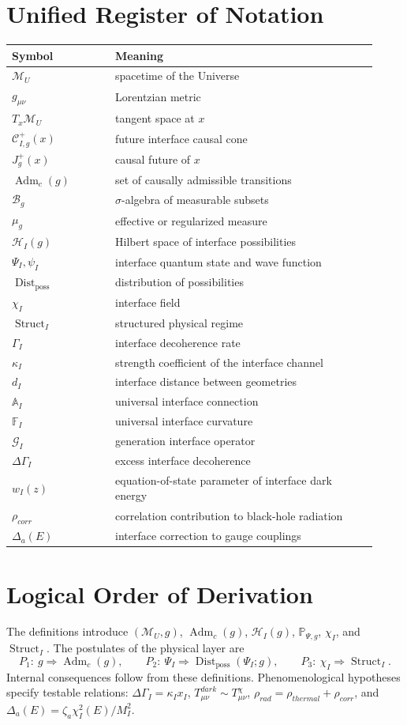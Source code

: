 \documentclass[12pt,a4paper]{article}
\DeclareMathOperator{\Adm}{Adm}
\DeclareMathOperator{\Struct}{Struct}
\DeclareMathOperator{\Dist}{Dist}
\newcommand{\M}{\mathcal M_U}
\newcommand{\Hilb}{\mathcal H}
\newcommand{\Prob}{\mathbb P}
\newcommand{\Acal}{\mathbb A_I}
\newcommand{\Fcal}{\mathbb F_I}
\begin{document}
\section{Unified Register of Notation}
\begin{longtable}{p{0.26\linewidth}p{0.66\linewidth}}
\toprule
Symbol & Meaning \\
\midrule
$\M$ & spacetime of the Universe \\
$g_{\mu\nu}$ & Lorentzian metric \\
$T_x\M$ & tangent space at $x$ \\
$\mathcal C^+_{I,g}(x)$ & future interface causal cone \\
$J_g^+(x)$ & causal future of $x$ \\
$\Adm_c(g)$ & set of causally admissible transitions \\
$\mathcal B_g$ & $\sigma$-algebra of measurable subsets \\
$\mu_g$ & effective or regularized measure \\
$\Hilb_I(g)$ & Hilbert space of interface possibilities \\
$\Psi_I,\psi_I$ & interface quantum state and wave function \\
$\Dist_{\mathrm{poss}}$ & distribution of possibilities \\
$\chi_I$ & interface field \\
$\Struct_I$ & structured physical regime \\
$\Gamma_I$ & interface decoherence rate \\
$\kappa_I$ & strength coefficient of the interface channel \\
$d_I$ & interface distance between geometries \\
$\Acal$ & universal interface connection \\
$\Fcal$ & universal interface curvature \\
$\mathcal G_I$ & generation interface operator \\
$\Delta\Gamma_I$ & excess interface decoherence \\
$w_I(z)$ & equation-of-state parameter of interface dark energy \\
$\rho_{corr}$ & correlation contribution to black-hole radiation \\
$\Delta_a(E)$ & interface correction to gauge couplings \\
\bottomrule
\end{longtable}

\section{Logical Order of Derivation}
The definitions introduce $(\M,g)$, $\Adm_c(g)$, $\Hilb_I(g)$, $\Prob_{\Psi,g}$, $\chi_I$, and $\Struct_I$. The postulates of the physical layer are
\[
\boxed{P_1:\ g\Rightarrow\Adm_c(g),}
\qquad
\boxed{P_2:\ \Psi_I\Rightarrow\Dist_{\mathrm{poss}}(\Psi_I;g),}
\qquad
\boxed{P_3:\ \chi_I\Rightarrow\Struct_I.}
\]
Internal consequences follow from these definitions. Phenomenological hypotheses specify testable relations: $\Delta\Gamma_I=\kappa_Ix_I$, $T_{\mu\nu}^{dark}\sim T_{\mu\nu}^{\chi}$, $\rho_{rad}=\rho_{thermal}+\rho_{corr}$, and $\Delta_a(E)=\zeta_a\chi_I^2(E)/M_I^2$.
\end{document}

